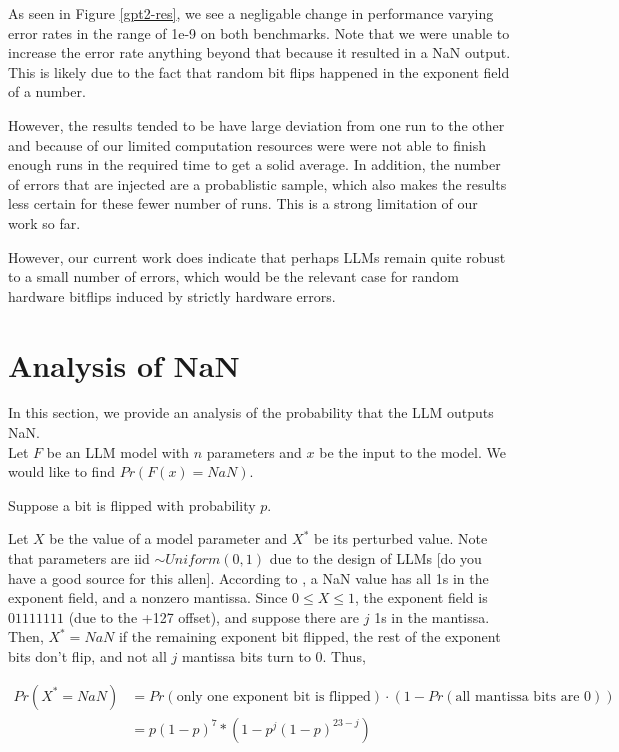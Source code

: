 \documentclass[a4paper]{article}
\begin{document}
As seen in Figure \ref{gpt2-res}, we see a negligable change in performance varying error rates in the range of 1e-9 on both benchmarks. Note that we were unable to increase the error rate anything beyond that because it resulted in a NaN output. This is likely due to the fact that random bit flips happened in the exponent field of a number.

However, the results tended to be have large deviation from one run to the other and because of our limited computation resources were were not able to finish enough runs in the required time to get a solid average. In addition, the number of errors that are injected are a probablistic sample, which also makes the results less certain for these fewer number of runs. This is a strong limitation of our work so far.

However, our current work does indicate that perhaps LLMs remain quite robust to a small number of errors, which would be the relevant case for random hardware bitflips induced by strictly hardware errors.

\section{Analysis of NaN}
In this section, we provide an analysis of the probability that the LLM outputs NaN. \\

Let $F$ be an LLM model with $n$ parameters and $x$ be the input to the model. We would like to find $Pr(F(x) = NaN)$.

Suppose a bit is flipped with probability $p$.

Let $X$ be the value of a model parameter and $X^*$ be its perturbed value. Note that parameters are iid $\sim Uniform(0, 1)$ due to the design of LLMs [do you have a good source for this allen]. According to \cite{IEEE754}, a NaN value has all 1s in the exponent field, and a nonzero mantissa. Since $0 \le X \le 1$, the exponent field is $01111111$ (due to the +127 offset), and suppose there are $j$ 1s in the mantissa. \\

Then, $X^* = NaN$ if the remaining exponent bit flipped, the rest of the exponent bits don't flip, and not all $j$ mantissa bits turn to 0. Thus,

\begin{align*}
	Pr(X^* = NaN) &= Pr(\text{only one exponent bit is flipped}) \cdot (1 - Pr(\text{all mantissa bits are 0})) \\
	&= p(1 - p)^7 * (1 - p^j(1 - p)^{23 - j})
\end{align*}
\end{document}
